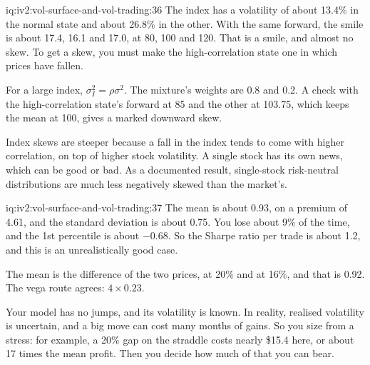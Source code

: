 \begin{solution}{iq:iv2:vol-surface-and-vol-trading:36}
The index has a volatility of about 13.4\% in the normal state and about 26.8\% in the other. With the same forward, the smile is about 17.4, 16.1 and 17.0, at 80, 100 and 120. That is a smile, and almost no skew. To get a skew, you must make the high-correlation state one in which prices have fallen.

For a large index, $\sigma_I^2 = \rho\sigma^2$. The mixture's weights are 0.8 and 0.2. A check with the high-correlation state's forward at 85 and the other at 103.75, which keeps the mean at 100, gives a marked downward skew.

Index skews are steeper because a fall in the index tends to come with higher correlation, on top of higher stock volatility. A single stock has its own news, which can be good or bad. As a documented result, single-stock risk-neutral distributions are much less negatively skewed than the market's.

\end{solution}

\begin{solution}{iq:iv2:vol-surface-and-vol-trading:37}
The mean is about 0.93, on a premium of 4.61, and the standard deviation is about 0.75. You lose about 9\% of the time, and the 1st percentile is about $-0.68$. So the Sharpe ratio per trade is about 1.2, and this is an unrealistically good case.

The mean is the difference of the two prices, at 20\% and at 16\%, and that is 0.92. The vega route agrees: $4 \times 0.23$.

Your model has no jumps, and its volatility is known. In reality, realised volatility is uncertain, and a big move can cost many months of gains. So you size from a stress: for example, a 20\% gap on the straddle costs nearly \$15.4 here, or about 17 times the mean profit. Then you decide how much of that you can bear.

\end{solution}


